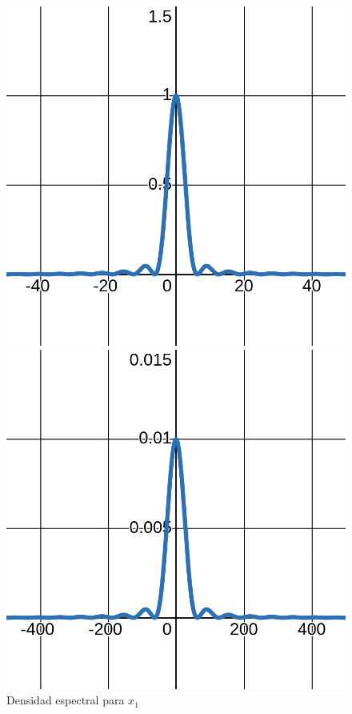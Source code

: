 \documentclass[12pt,a4paper]{report}
\begin{document}
\begin{enumerate}[label=\alph*),left=0pt]
\begin {itemize}[left=0pt]
        \begin{figure}[h!]
          \hspace{10mm}
          \begin{minipage}{0.45\textwidth}
            \centering
            \includegraphics[width=\textwidth]{images/ej3.7}
            \caption{Densidad espectral para $x_1$}
            \label{fig:imagen1}
          \end{minipage}
          \hfill
          \begin{minipage}{0.45\textwidth}
            \centering
            \includegraphics[width=\textwidth]{images/ej3.8}

\end{minipage}
\end{figure}
\end{itemize}
\end{enumerate}
\end{document}
